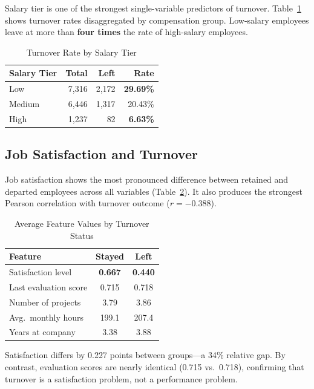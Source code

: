 \documentclass[conference]{IEEEtran}
\begin{document}
Salary tier is one of the strongest single-variable predictors of turnover.
Table~\ref{tab:salary} shows turnover rates disaggregated by compensation
group. Low-salary employees leave at more than \textbf{four times} the rate
of high-salary employees.

\begin{table}[h]
\caption{Turnover Rate by Salary Tier}
\label{tab:salary}
\centering
\begin{tabular}{lrrr}
\toprule
\textbf{Salary Tier} & \textbf{Total} & \textbf{Left} & \textbf{Rate} \\
\midrule
Low    & 7,316 & 2,172 & \textbf{29.69\%} \\
Medium & 6,446 & 1,317 & 20.43\% \\
High   & 1,237 &    82 & \textbf{6.63\%} \\
\bottomrule
\end{tabular}
\end{table}

\subsection{Job Satisfaction and Turnover}

Job satisfaction shows the most pronounced difference between retained and
departed employees across all variables (Table~\ref{tab:avgs}). It also
produces the strongest Pearson correlation with turnover outcome
($r = -0.388$).

\begin{table}[h]
\caption{Average Feature Values by Turnover Status}
\label{tab:avgs}
\centering
\begin{tabular}{lcc}
\toprule
\textbf{Feature} & \textbf{Stayed} & \textbf{Left} \\
\midrule
Satisfaction level      & \textbf{0.667} & \textbf{0.440} \\
Last evaluation score   & 0.715 & 0.718 \\
Number of projects      & 3.79  & 3.86  \\
Avg.\ monthly hours     & 199.1 & 207.4 \\
Years at company        & 3.38  & 3.88  \\
\bottomrule
\end{tabular}
\end{table}

Satisfaction differs by 0.227 points between groups---a 34\% relative gap.
By contrast, evaluation scores are nearly identical (0.715 vs.\ 0.718),
confirming that turnover is a satisfaction problem, not a performance problem.
\end{document}
